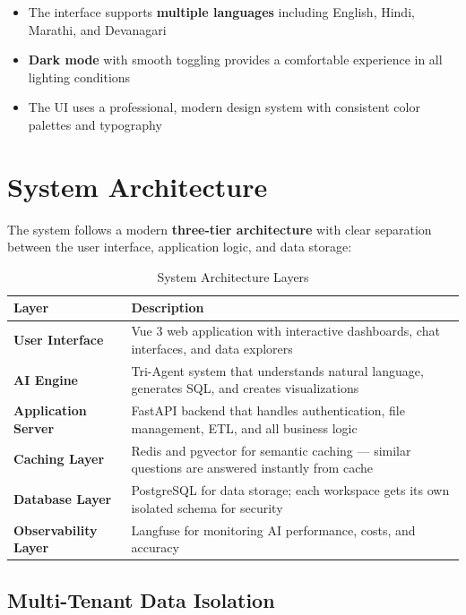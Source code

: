 \documentclass[12pt,a4paper]{report}
\begin{document}
\begin{itemize}[leftmargin=1.5cm]
    \item The interface supports \textbf{multiple languages} including English, Hindi, Marathi, and Devanagari
    \item \textbf{Dark mode} with smooth toggling provides a comfortable experience in all lighting conditions
    \item The UI uses a professional, modern design system with consistent color palettes and typography
\end{itemize}

\section{System Architecture}

The system follows a modern \textbf{three-tier architecture} with clear separation between the user interface, application logic, and data storage:

\begin{table}[H]
\centering
\caption{System Architecture Layers}
\begin{tabular}{>{\bfseries}p{4cm} p{8.5cm}}
\toprule
\textbf{Layer} & \textbf{Description} \\
\midrule
User Interface & Vue 3 web application with interactive dashboards, chat interfaces, and data explorers \\
AI Engine & Tri-Agent system that understands natural language, generates SQL, and creates visualizations \\
Application Server & FastAPI backend that handles authentication, file management, ETL, and all business logic \\
Caching Layer & Redis and pgvector for semantic caching --- similar questions are answered instantly from cache \\
Database Layer & PostgreSQL for data storage; each workspace gets its own isolated schema for security \\
Observability Layer & Langfuse for monitoring AI performance, costs, and accuracy \\
\bottomrule
\end{tabular}
\label{tab:architecture}
\end{table}

\subsection{Multi-Tenant Data Isolation}
\end{document}
